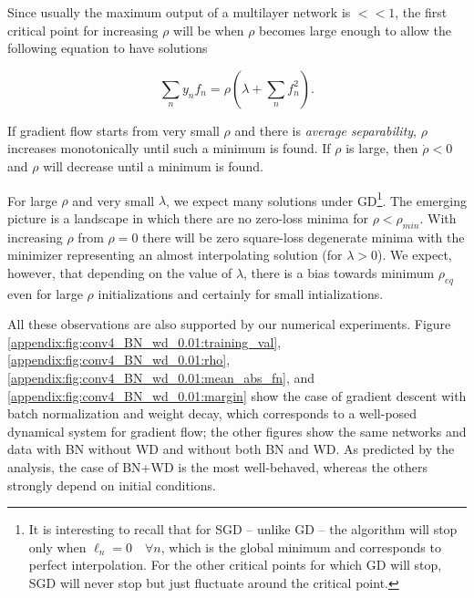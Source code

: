 \documentclass[11pt]{article}
\begin{document}

Since
usually the maximum output of a multilayer
network   is $<<1$, the first critical point for increasing $\rho$ will
be when $\rho$ becomes  large enough to allow the following equation to
have solutions 

\begin{equation}
\sum_n  y_n f_n=\rho (\lambda +\sum_n f^2_n).
\end{equation}


If gradient flow starts from very small $\rho$ and there is {\it
  average separability}, $\rho$ increases monotonically until such a
minimum is found. If $\rho$ is
  large, then $\dot{\rho} <0$ and $\rho$ will decrease until a minimum
  is found.

For large $\rho$ and very small $\lambda$, we expect many  solutions  under GD\footnote{It is interesting to recall
\cite{PoggioCooper} that for SGD -- unlike GD -- the algorithm will
stop only when $\ell_n=0 \quad \forall n$, which is the global minimum
and corresponds to perfect interpolation. For the other critical
points for which GD will stop, SGD will never stop but just fluctuate
around the critical point.}. 
The emerging picture is a landscape in
which there are no zero-loss  minima for $\rho < \rho_{min}$. With increasing
$\rho$ from $\rho=0$ there will be   zero square-loss degenerate
minima
with the minimizer representing an almost interpolating solution (for $\lambda>0$). We expect,
however, that depending on the value of $\lambda$, there is a bias towards minimum $\rho_{eq}$
even for large $\rho$ initializations and certainly for small intializations.



All these observations are also supported by our numerical
experiments.  Figure \ref{appendix:fig:conv4_BN_wd_0.01:training_val},
\ref{appendix:fig:conv4_BN_wd_0.01:rho},
\ref{appendix:fig:conv4_BN_wd_0.01:mean_abs_fn},
and
\ref{appendix:fig:conv4_BN_wd_0.01:margin} show the case of gradient
descent with batch normalization and weight decay, which corresponds
to a well-posed dynamical system for gradient flow; the other figures
show the same networks and data with BN without WD and without both BN
and WD. As predicted by the analysis, the case of BN+WD is the most
well-behaved, whereas the others strongly depend on initial
conditions.
\end{document}
